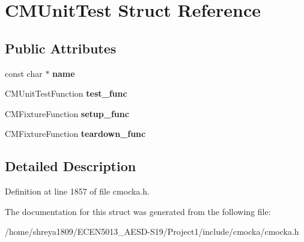 \hypertarget{structCMUnitTest}{}\section{C\+M\+Unit\+Test Struct Reference}
\label{structCMUnitTest}
\subsection*{Public Attributes}
\begin{DoxyCompactItemize}
\item 
\mbox{\label{structCMUnitTest_a115e636bc4fc5bc659542c31062d3a7e}} 
const char $\ast$ {\bfseries name}
\item 
\mbox{\label{structCMUnitTest_a4343f737815738bbe68cfc70ba9fe5ce}} 
C\+M\+Unit\+Test\+Function {\bfseries test\+\_\+func}
\item 
\mbox{\label{structCMUnitTest_a08ba500fe742b4f37fcce0f55b573d68}} 
C\+M\+Fixture\+Function {\bfseries setup\+\_\+func}
\item 
\mbox{\label{structCMUnitTest_a23673109a540c9e5f259fb86562a354a}} 
C\+M\+Fixture\+Function {\bfseries teardown\+\_\+func}
\end{DoxyCompactItemize}


\subsection{Detailed Description}


Definition at line 1857 of file cmocka.\+h.



The documentation for this struct was generated from the following file\+:\begin{DoxyCompactItemize}
\item 
/home/shreya1809/\+E\+C\+E\+N5013\+\_\+\+A\+E\+S\+D-\/\+S19/\+Project1/include/cmocka/cmocka.\+h\end{DoxyCompactItemize}
